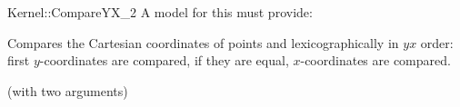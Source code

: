 \begin{ccRefFunctionObjectConcept}{Kernel::CompareYX_2}
A model for this must provide:


      {Compares the Cartesian coordinates of points  and
        lexicographically in $yx$ order: first 
       $y$-coordinates are compared, if they are equal, $x$-coordinates
       are compared.}

\ccRefines
{} (with two arguments)

\ccSeeAlso
{} \\
 \\

\end{ccRefFunctionObjectConcept}
